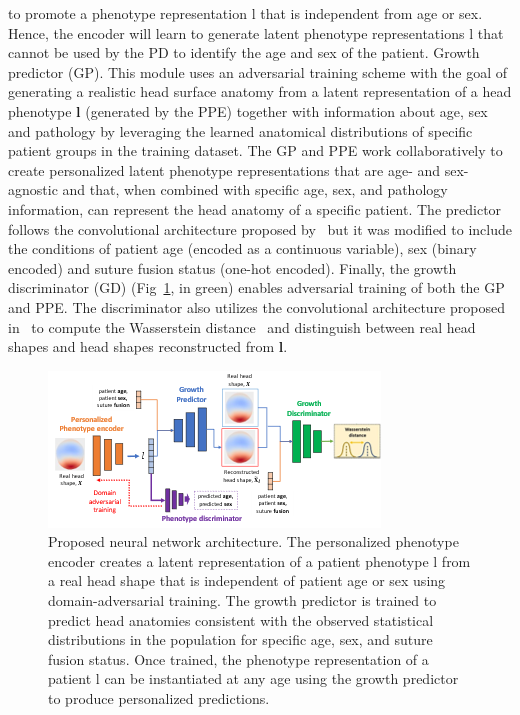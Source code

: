\documentclass[conference]{IEEEtran}
\begin{document}
to promote a phenotype representation l that is independent from age or sex. Hence, the encoder will learn to generate latent phenotype representations l that cannot be used by the PD to identify the age and sex of the patient.
Growth predictor (GP). This module uses an adversarial training scheme with the goal of generating a realistic head surface anatomy from a latent representation of a head phenotype \textbf{l} (generated by the PPE) together with information about age, sex and pathology by leveraging the learned anatomical distributions of specific patient groups in the training dataset. The GP and PPE work collaboratively to create personalized latent phenotype representations that are age- and sex-agnostic and that, when combined with specific age, sex, and pathology information, can represent the head anatomy of a specific patient. The predictor follows the convolutional architecture proposed by~\cite{Radford2016Unsupervised} but it was modified to include the conditions of patient age (encoded as a continuous variable), sex (binary encoded) and suture fusion status (one-hot encoded).
Finally, the growth discriminator (GD) (Fig~\ref{fig:architecture}, in green) enables adversarial training of both the GP and PPE. The discriminator also utilizes the convolutional architecture proposed in~\cite{Radford2016Unsupervised} to compute the Wasserstein distance~\cite{Gulrajani2017Improved} and distinguish between real head shapes and head shapes reconstructed from \textbf{l}.
\begin{figure}[!t]
\centering
\includegraphics[width=\columnwidth]{figures/NetworkArchitecture.png}
\caption{Proposed neural network architecture. The personalized phenotype encoder creates a latent representation of a patient phenotype l from a real head shape that is independent of patient age or sex using domain-adversarial training. The growth predictor is trained to predict head anatomies consistent with the observed statistical distributions in the population for specific age, sex, and suture fusion status. Once trained, the phenotype representation of a patient l can be instantiated at any age using the growth predictor to produce personalized predictions.}
\label{fig:architecture}
\end{figure}
\end{document}
